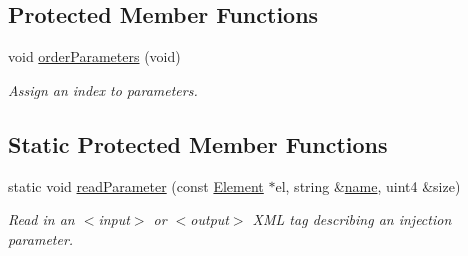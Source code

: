 \subsection*{Protected Member Functions}
\begin{DoxyCompactItemize}
\item 
void \mbox{\hyperlink{class_inject_payload_ad9ff2141b50a358375dd5cd5df63c3f0}{order\+Parameters}} (void)
\begin{DoxyCompactList}\small\item\em Assign an index to parameters. \end{DoxyCompactList}\end{DoxyCompactItemize}
\subsection*{Static Protected Member Functions}
\begin{DoxyCompactItemize}
\item 
static void \mbox{\hyperlink{class_inject_payload_a839a640c9f475f0ddc964e4038169b47}{read\+Parameter}} (const \mbox{\hyperlink{class_element}{Element}} $\ast$el, string \&\mbox{\hyperlink{class_inject_payload_a709732dc6d429767b1ef8046cc0f5573}{name}}, uint4 \&size)
\begin{DoxyCompactList}\small\item\em Read in an $<$input$>$ or $<$output$>$ X\+ML tag describing an injection parameter. \end{DoxyCompactList}\end{DoxyCompactItemize}
